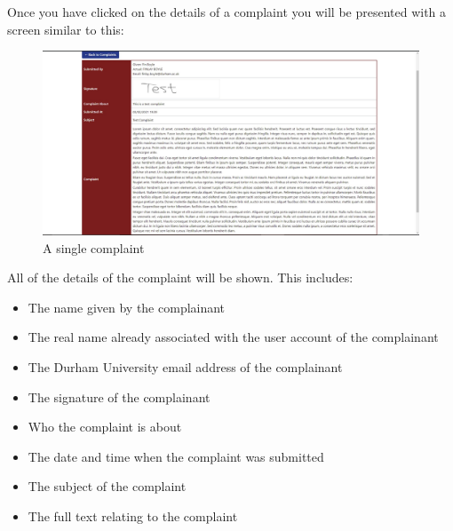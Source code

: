\documentclass{article}
\begin{document}
Once you have clicked on the details of a complaint you will be presented with a screen similar to this:
\begin{figure}[H]
    \centering
    \includegraphics[width=\textwidth,height=\textheight,keepaspectratio]{complaints/complaints_single.png}
    \caption{A single complaint}
    \label{fig:complaints_single}
\end{figure}
All of the details of the complaint will be shown. This includes:
\begin{itemize}
    \item The name given by the complainant
    \item The real name already associated with the user account of the complainant
    \item The Durham University email address of the complainant
    \item The signature of the complainant
    \item Who the complaint is about 
    \item The date and time when the complaint was submitted
    \item The subject of the complaint
    \item The full text relating to the complaint
\end{itemize}
\end{document}

